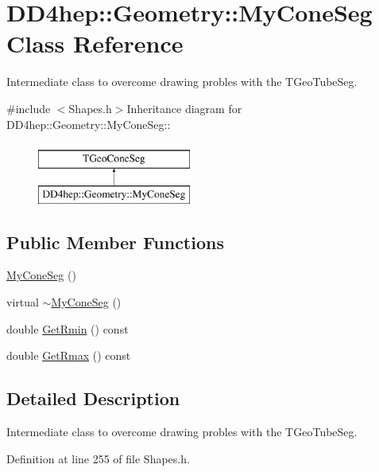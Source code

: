 \hypertarget{class_d_d4hep_1_1_geometry_1_1_my_cone_seg}{
\section{DD4hep::Geometry::MyConeSeg Class Reference}
\label{class_d_d4hep_1_1_geometry_1_1_my_cone_seg}
}


Intermediate class to overcome drawing probles with the TGeoTubeSeg.  


{\ttfamily \#include $<$Shapes.h$>$}Inheritance diagram for DD4hep::Geometry::MyConeSeg::\begin{figure}[H]
\begin{center}
\leavevmode
\includegraphics[height=2cm]{class_d_d4hep_1_1_geometry_1_1_my_cone_seg}
\end{center}
\end{figure}
\subsection*{Public Member Functions}
\begin{DoxyCompactItemize}
\item 
\hyperlink{class_d_d4hep_1_1_geometry_1_1_my_cone_seg_a9979507bda1f61e91e7859b4b6144025}{MyConeSeg} ()
\item 
virtual \hyperlink{class_d_d4hep_1_1_geometry_1_1_my_cone_seg_a0042f0670c9b2367a0b8512564fc9b80}{$\sim$MyConeSeg} ()
\item 
double \hyperlink{class_d_d4hep_1_1_geometry_1_1_my_cone_seg_ab706706bc293f463fa5a70881f1c4bac}{GetRmin} () const 
\item 
double \hyperlink{class_d_d4hep_1_1_geometry_1_1_my_cone_seg_a61b59a27d8135d02c4449bfa5569abe1}{GetRmax} () const 
\end{DoxyCompactItemize}


\subsection{Detailed Description}
Intermediate class to overcome drawing probles with the TGeoTubeSeg. 

Definition at line 255 of file Shapes.h.

